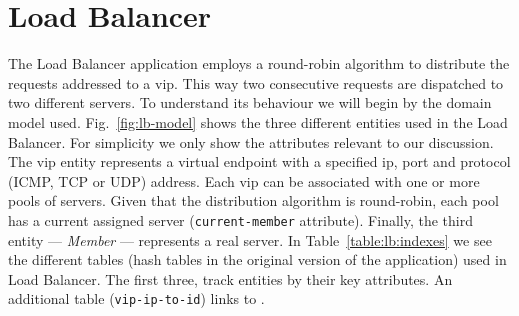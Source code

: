 

\section{Load Balancer}
\label{sec:feasibility:lb}
\glsresetall
The Load Balancer application employs a round-robin algorithm to distribute the requests addressed to a \gls{vip}. This way two consecutive requests are dispatched to two different servers. 
To understand its behaviour we will begin by the domain model used. Fig.~\ref{fig:lb-model} shows the three different entities used in the Load Balancer. For simplicity we only show the attributes relevant to our discussion.
The \gls{vip} entity represents a virtual endpoint with a specified \gls{ip}, port and protocol (ICMP, TCP or UDP) address. 
Each \gls{vip} can be associated with one or more pools of servers. Given that the distribution algorithm is round-robin, each pool has a current assigned server (\texttt{current-member} attribute). Finally, the third entity --- \emph{Member} --- represents a real server. 
In Table~\ref{table:lb:indexes} we see the different tables (hash tables in the original version of the application) used in Load Balancer.
The first three, track entities by their key attributes. An additional table (\texttt{vip-ip-to-id})  links   to . 

\begin{figure}[ht]
\TopFloatBoxes
\begin{floatrow}


\end{floatrow}
\end{figure}

